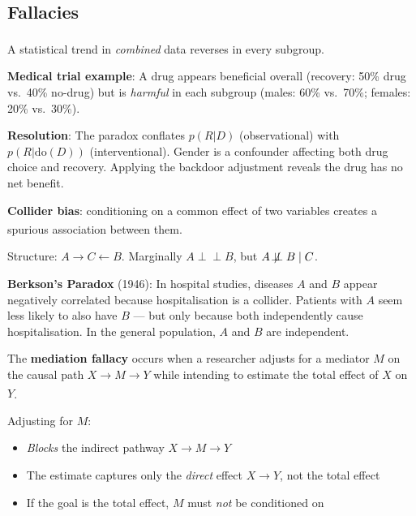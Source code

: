     \subsection{Fallacies}
    \begin{tcbitemize}[ skin=sectionraster ]

    \tcbitem[title=Simpson’s Paradox, raster multicolumn=3]
    A statistical trend in \emph{combined} data reverses in every
    subgroup.\textsuperscript{\cite[][pp.~49--50]{barberBayesianReasoningMachine2012}}

    \textbf{Medical trial example}: A drug appears beneficial overall
    (recovery: 50\% drug vs.\ 40\% no-drug) but is \emph{harmful} in each
    subgroup (males: 60\% vs.\ 70\%; females: 20\% vs.\ 30\%).

    \textbf{Resolution}: The paradox conflates $p(R|D)$ (observational)
    with $p(R|\mathrm{do}(D))$ (interventional). Gender is a confounder
    affecting both drug choice and recovery. Applying the backdoor
    adjustment reveals the drug has no net benefit.

    \tcbitem[title={Collider Bias \& Berkson’s Paradox}, raster multicolumn=3]
    \textbf{Collider bias}: conditioning on a common effect of two variables
    creates a spurious association between
    them.\textsuperscript{\cite[][p.~43]{barberBayesianReasoningMachine2012}}

    Structure: $A \to C \leftarrow B$. Marginally $A \perp\!\!\!\perp B$, but
    $A \not\!\perp\!\!\!\perp B \mid C$.

    \textbf{Berkson’s Paradox} (1946): In hospital studies, diseases $A$ and
    $B$ appear negatively correlated because hospitalisation is a collider.
    Patients with $A$ seem less likely to also have $B$ --- but only because
    both independently cause hospitalisation. In the general population, $A$
    and $B$ are independent.

    \tcbitem[title=Mediation Fallacy, raster multicolumn=3]
    The \textbf{mediation fallacy} occurs when a researcher adjusts for a
    mediator $M$ on the causal path $X \to M \to Y$ while intending to
    estimate the total effect of $X$ on
    $Y$.\textsuperscript{\cite[][Ch.~9]{pearlCausalityModelsReasoning2009}}

    Adjusting for $M$:
    \begin{itemize}
        \item \emph{Blocks} the indirect pathway $X \to M \to Y$
        \item The estimate captures only the \emph{direct} effect $X \to Y$,
              not the total effect
        \item If the goal is the total effect, $M$ must \emph{not} be
              conditioned on
    \end{itemize}


\end{tcbitemize}
